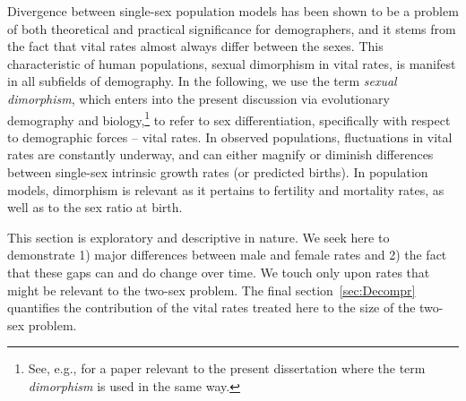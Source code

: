  \FloatBarrier
Divergence between single-sex population models has been shown to be a problem
of both theoretical and practical significance for demographers, and it stems from
the fact that vital rates almost always differ between the sexes.
This characteristic of human populations, sexual dimorphism in vital rates,
is manifest in all subfields of demography. In the following, we use the
term \textit{sexual dimorphism}, which enters into the present discussion via
evolutionary demography and biology,\footnote{See, e.g., \citet{caswell1986two}
for a paper relevant to the present dissertation where the term \textit{dimorphism} is used
in the same way.} to refer to sex differentiation, specifically with respect to
demographic forces -- vital rates. In observed populations, fluctuations in
vital rates are constantly underway, and can either magnify or diminish differences between 
single-sex intrinsic growth rates (or predicted births). 
In population models, dimorphism is relevant as it pertains to fertility and mortality 
rates, as well as to the sex ratio at birth.

This section is exploratory and descriptive in nature. We seek here to
demonstrate 1) major differences between male and female rates and 2) the fact
that these gaps can and do change over time. We touch only upon rates that might
be relevant to the two-sex problem. The final section~\ref{sec:Decompr}
quantifies the contribution of the vital rates treated here to the size of the
two-sex problem.
